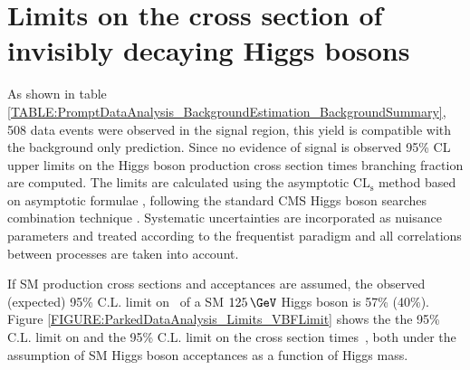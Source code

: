 \section{Limits on the cross section of invisibly decaying Higgs bosons}
\label{SECTION:ParkedDataAnalysis_Limits}


As shown in table \ref{TABLE:PromptDataAnalysis_BackgroundEstimation_BackgroundSummary}, 508 data events were observed in the signal region, this yield is compatible with the background only prediction. Since no evidence of signal is observed 95\% \gls{CL} upper limits on the Higgs boson production cross section times branching fraction are computed. The limits are calculated using the asymptotic $\mathrm{CL}_\mathrm{s}$ method \cite{ARTICLE:CLsTechnique,ARTICLE:CLCompForCombiningSearchesWithSmallStat,ARTICLE:HandbookofLHCHiggsCrossSectionsDifferentialDistributions} based on asymptotic formulae \cite{ARTICLE:AsymptoticCLS}, following the standard \gls{CMS} Higgs boson searches combination technique \cite{ARTICLE:CMS_HiggsDiscovery,ARTICLE:HiggsCombination}. Systematic uncertainties are incorporated as nuisance parameters and treated according to the frequentist paradigm \cite{ARTICLE:HiggsCombination} and all correlations between processes are taken into account.

If \gls{SM} production cross sections and acceptances are assumed, the observed (expected) 95\% C.L. limit on \BRinv\, of a \gls{SM} $125\,\GeV$ Higgs boson is 57\% (40\%). Figure \ref{FIGURE:ParkedDataAnalysis_Limits_VBFLimit} shows the the 95\% C.L. limit on \BRinv and the 95\% C.L. limit on the cross section times \BRinv\,, both under the assumption of \gls{SM} Higgs boson acceptances as a function of Higgs mass.

